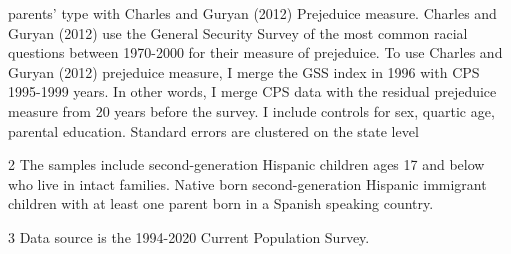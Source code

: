 \begin{table}[H]
{\begin{threeparttable}
\begin{tablenotes}
{                      parents' type with Charles and Guryan (2012) Prejeduice measure. 
                      Charles and Guryan (2012) use the General Security Survey of the most common racial questions between 1970-2000 for their measure of prejeduice.
                      To use Charles and Guryan (2012) prejeduice measure, I merge the GSS index in 1996 with CPS 1995-1999 years. 
                      In other words, I merge CPS data with the residual prejeduice measure from 20 years before the survey.
                      I include controls for sex, quartic age, parental education.
                      Standard errors are clustered on the state level}
\item[2] \footnotesize{The samples include second-generation Hispanic children ages 17 and below who live in intact families. 
                      Native born second-generation Hispanic 
                      immigrant children with at least one parent born in a Spanish speaking 
                      country.}
\item[3] \footnotesize{Data source is the 1994-2020 Current Population Survey.}
\end{tablenotes}
\end{threeparttable}}
\end{table}
